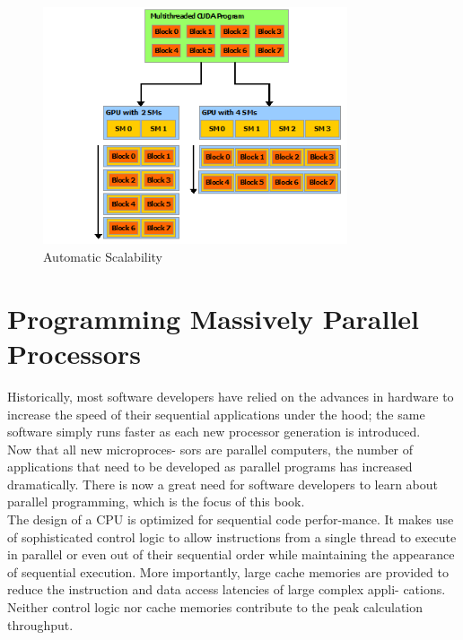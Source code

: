 \documentclass[11pt]{ctexart}
\begin{document}
\begin{figure}[ht]
    \centering
    \includegraphics[width=0.8\textwidth]{photos/AutomaticScalability.png}
    \caption{Automatic Scalability}
    \label{fig:2}
\end{figure}

\newpage
\section{Programming Massively Parallel Processors}

Historically, most software developers have relied on the advances in hardware to
increase the speed of their sequential applications under the hood; the same software
simply runs faster as each new processor generation is introduced.\\

Now that all new microproces-
sors are parallel computers, the number of applications that need to be developed as
parallel programs has increased dramatically. There is now a great need for software
developers to learn about parallel programming, which is the focus of this book.\\

The design of a CPU is optimized for sequential code perfor-mance. It makes use of sophisticated control logic to allow instructions from a single
thread to execute in parallel or even out of their sequential order while maintaining
the appearance of sequential execution. More importantly, large cache memories are
provided to reduce the instruction and data access latencies of large complex appli-
cations. Neither control logic nor cache memories contribute to the peak calculation
throughput.\\
\end{document}
